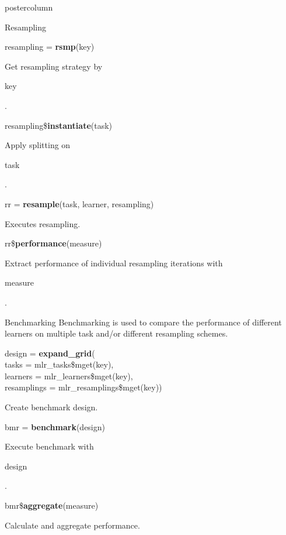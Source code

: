\documentclass{beamer}
\newcommand{\codeinline}[1]{\begin{codeboxinline}#1\end{codeboxinline}}
\begin{document}
\begin{frame}[fragile]{}
\begin{columns}
\begin{column}{.245\textwidth}
\begin{beamercolorbox}[center]{postercolumn}
\begin{minipage}{.98\textwidth}
{\begin{myblock}{Resampling}
							\\
							\begin{codebox}
								resampling = \textbf{rsmp}(key)
							\end{codebox}
							Get resampling strategy by \codeinline{key}.
							\\
							\begin{codebox}
								resampling\$\textbf{instantiate}(task)
							\end{codebox}
							Apply splitting on \codeinline{task}.
							\\
							\begin{codebox}
								rr = \textbf{resample}(task, learner, resampling)
							\end{codebox}
							Executes resampling.
							\\
							\begin{codebox}
								rr\$\textbf{performance}(measure)
							\end{codebox}
							Extract performance of individual resampling iterations with \codeinline{measure}.
						\end{myblock}
						\begin{myblock}{Benchmarking}
							Benchmarking is used to compare the performance of different learners on multiple task and/or different resampling schemes.
							\\
							\begin{codeboxmultiline}[width=21.95cm]
								design = \textbf{expand\_grid}(\\
								\hspace*{1ex}tasks = mlr\_tasks\$mget(key),\\
								\hspace*{1ex}learners = mlr\_learners\$mget(key),\\
								\hspace*{1ex}resamplings = mlr\_resamplings\$mget(key))
							\end{codeboxmultiline}
							Create benchmark design.
							\\
							\begin{codebox}
								bmr = \textbf{benchmark}(design)
							\end{codebox}
							Execute benchmark with \codeinline{design}.
							\\
							\begin{codebox}
								bmr\$\textbf{aggregate}(measure)
							\end{codebox}
							Calculate and aggregate performance.
						\end{myblock}\vfill
					}
				\end{minipage}
			\end{beamercolorbox}
		\end{column}
	\end{columns}
\end{frame}
\end{document}
